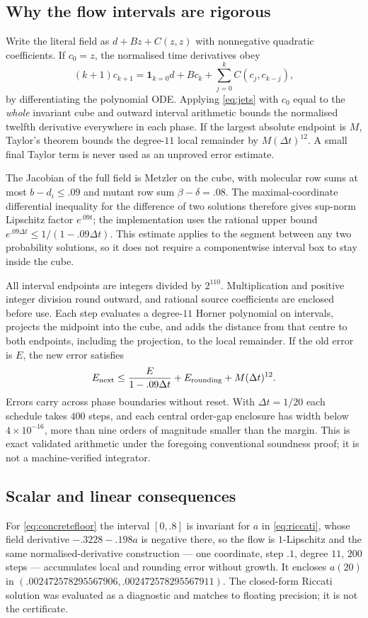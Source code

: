\documentclass[11pt]{article}
\theoremstyle{remark}
\newcommand{\one}{\mathbf 1}
\begin{document}
\subsection{Why the flow intervals are rigorous}
Write the literal field as $d+Bz+C(z,z)$ with nonnegative quadratic
coefficients. If $c_0=z$, the normalised time derivatives obey
\begin{equation}
 (k+1)c_{k+1}=\one_{k=0}d+Bc_k+\sum_{j=0}^kC(c_j,c_{k-j}),\label{eq:jets}
\end{equation}
by differentiating the polynomial ODE. Applying \eqref{eq:jets} with $c_0$ equal
to the \emph{whole} invariant cube and outward interval arithmetic bounds the
normalised twelfth derivative everywhere in each phase. If the largest absolute
endpoint is $M$, Taylor's theorem bounds the degree-$11$ local remainder by
$M(\Delta t)^{12}$. A small final Taylor term is never used as an unproved error
estimate.

The Jacobian of the full field is Metzler on the cube, with molecular row sums at
most $b-d_i\le.09$ and mutant row sum $\beta-\delta=.08$. The maximal-coordinate
differential inequality for the difference of two solutions therefore gives
sup-norm Lipschitz factor $e^{.09t}$; the implementation uses the rational upper
bound $e^{.09\Delta t}\le1/(1-.09\Delta t)$. This estimate applies to the segment
between any two probability solutions, so it does not require a componentwise
interval box to stay inside the cube.

All interval endpoints are integers divided by $2^{110}$. Multiplication and
positive integer division round outward, and rational source coefficients are
enclosed before use. Each step evaluates a degree-$11$ Horner polynomial on
intervals, projects the midpoint into the cube, and adds the distance from that
centre to both endpoints, including the projection, to the local remainder. If
the old error is $E$, the new error satisfies
\[
 E_{\rm next}\le\frac{E}{1-.09\Delta t}+E_{\rm rounding}+M(\Delta t)^{12}.
\]
Errors carry across phase boundaries without reset. With $\Delta t=1/20$ each
schedule takes $400$ steps, and each central order-gap enclosure has width below
$4\times10^{-16}$, more than nine orders of magnitude smaller than the margin.
This is exact validated arithmetic under the foregoing conventional soundness
proof; it is not a machine-verified integrator.

\subsection{Scalar and linear consequences}\label{sec:linear}
For \eqref{eq:concretefloor} the interval $[0,.8]$ is invariant for $a$ in
\eqref{eq:riccati}, whose field derivative $-.3228-.198a$ is negative there, so
the flow is $1$-Lipschitz and the same normalised-derivative construction --- one
coordinate, step $.1$, degree $11$, $200$ steps --- accumulates local and rounding
error without growth. It encloses $a(20)$ in
$(.002472578295567906,.002472578295567911)$. The closed-form Riccati solution was
evaluated as a diagnostic and matches to floating precision; it is not the
certificate.
\end{document}
